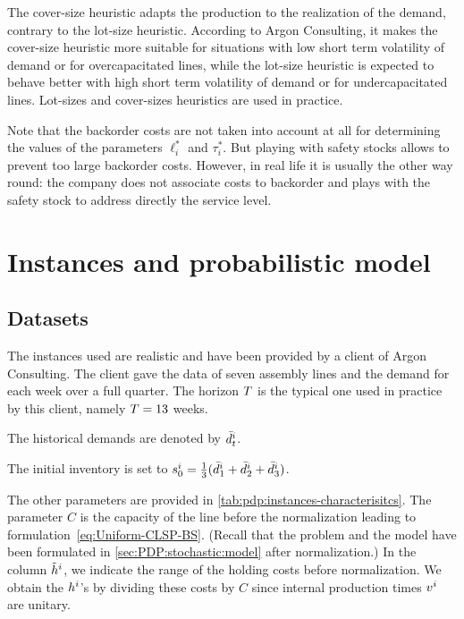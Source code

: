 The cover-size heuristic adapts the production to the realization of the demand, contrary to the lot-size heuristic.
According to Argon Consulting, it makes the cover-size heuristic more suitable for situations with low short term volatility of demand or for overcapacitated lines, while the lot-size heuristic is expected to behave better with high short term volatility of demand or for undercapacitated lines. Lot-sizes and cover-sizes heuristics are used in practice.


Note that the backorder costs are not taken into account at all for determining the values of the parameters $\ell_i^*$ and $\tau_i^*$.
But playing with safety stocks allows to prevent too large backorder costs.
However, in real life it is usually the other way round: the company does not associate costs to backorder and plays with the safety stock to address directly the service level.


\section{Instances and probabilistic model}
\label{sec:PDP:numerical-experiments:instances}


\subsection{Datasets}
\label{sec:PDP:numerical-experiments:historical-data}


The instances used are realistic and have been provided by a client of Argon Consulting.
The client gave the data of seven assembly lines and the demand for each week over a full quarter.
The horizon $T$ is the typical one used in practice by this client, namely $T=13$ weeks.


The historical demands are denoted by $\bar{d}_t^i$.


The initial inventory is set to $s_0^i=\frac{1}{3}(\bar{d}_1^i+\bar{d}_2^i+\bar{d}_3^i)$.


The other parameters are provided in \cref{tab:pdp:instances-characterisitcs}.
The parameter $C$ is the capacity of the line before the normalization leading to formulation~\eqref{eq:Uniform-CLSP-BS}.
(Recall that the problem and the model have been formulated in \cref{sec:PDP:stochastic:model} after normalization.)
In the column $\tilde{h}^i$, we indicate the range of the holding costs before normalization.
We obtain the $h^i$'s by dividing these costs by $C$ since internal production times $v^i$ are unitary.



